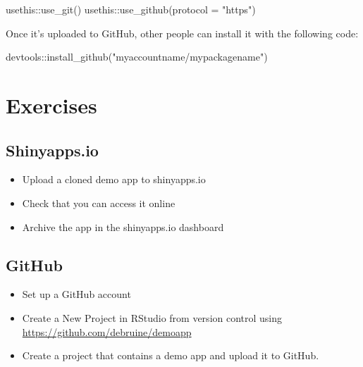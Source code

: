\documentclass[
  oneside]{book}
\newenvironment{Shaded}{\begin{snugshade}}{\end{snugshade}}
\newcommand{\AttributeTok}[1]{\textcolor[rgb]{0.77,0.63,0.00}{#1}}
\newcommand{\FunctionTok}[1]{\textcolor[rgb]{0.00,0.00,0.00}{#1}}
\newcommand{\NormalTok}[1]{#1}
\newcommand{\SpecialCharTok}[1]{\textcolor[rgb]{0.00,0.00,0.00}{#1}}
\newcommand{\StringTok}[1]{\textcolor[rgb]{0.31,0.60,0.02}{#1}}
\providecommand{\tightlist}{%
  \setlength{\itemsep}{0pt}\setlength{\parskip}{0pt}}
\begin{document}
\begin{Shaded}
\begin{Highlighting}[]
\NormalTok{usethis}\SpecialCharTok{::}\FunctionTok{use\_git}\NormalTok{()}
\NormalTok{usethis}\SpecialCharTok{::}\FunctionTok{use\_github}\NormalTok{(}\AttributeTok{protocol =} \StringTok{"https"}\NormalTok{)}
\end{Highlighting}
\end{Shaded}

Once it's uploaded to GitHub, other people can install it with the following code:

\begin{Shaded}
\begin{Highlighting}[]
\NormalTok{devtools}\SpecialCharTok{::}\FunctionTok{install\_github}\NormalTok{(}\StringTok{"myaccountname/mypackagename"}\NormalTok{)}
\end{Highlighting}
\end{Shaded}

\hypertarget{exercises-sharing}{%
\section{Exercises}\label{exercises-sharing}}

\hypertarget{shinyapps.io-1}{%
\subsection{Shinyapps.io}\label{shinyapps.io-1}}

\begin{itemize}
\tightlist
\item
  Upload a cloned demo app to shinyapps.io
\item
  Check that you can access it online
\item
  Archive the app in the shinyapps.io dashboard
\end{itemize}

\hypertarget{github-1}{%
\subsection{GitHub}\label{github-1}}

\begin{itemize}
\tightlist
\item
  Set up a GitHub account
\item
  Create a New Project in RStudio from version control using \url{https://github.com/debruine/demoapp}
\item
  Create a project that contains a demo app and upload it to GitHub.
\end{itemize}
\end{document}
